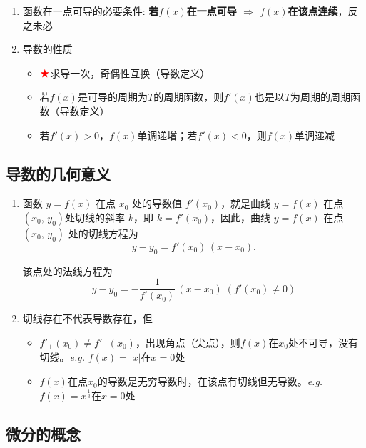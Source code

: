 \documentclass[a4paper,12pt]{article}
\begin{document}
\begin{enumerate}
        \item 函数在一点可导的必要条件: \textbf{若$f(x)$在一点可导 $\Rightarrow$ $f(x)$在该点连续}，反之未必
        \item 导数的性质
        \begin{itemize}
            \item $\color{red}{\bigstar}$求导一次，奇偶性互换（导数定义）
            \item 若$f(x)$是可导的周期为$T$的周期函数，则$f'(x)$也是以$T$为周期的周期函数（导数定义）
            \item 若$f'(x) > 0$，$f(x)$单调递增；若$f'(x) < 0$，则$f(x)$单调递减
        \end{itemize}
    \end{enumerate}

    \subsection{导数的几何意义}

    \begin{enumerate}
        \item 函数 $y=f(x)$ 在点 $x_0$ 处的导数值 $f'(x_0)$，就是曲线 $y=f(x)$ 在点 $(x_0,\,y_0)$处切线的斜率 $k$，即 $k = f'(x_0)$，因此，曲线 $y=f(x)$ 在点 $(x_0,\,y_0)$ 处的切线方程为
        \[
            y - y_0 = f'(x_0)\,(x - x_0).
        \]

        该点处的法线方程为
        \[
            y - y_0 = -\frac{1}{f'(x_0)}\,(x - x_0) \; (f'(x_0) \neq 0)
        \]
        \item 切线存在不代表导数存在，但{\color{red}{导数存在切线一定存在}}
        \begin{itemize}
            \item $f'_+(x_0) \neq f'_-(x_0)$，出现角点（尖点），则$f(x)$在$x_0$处不可导，没有切线。\emph{e.g.} $f(x) = |x|$在$x = 0$处
            \item $f(x)$在点$x_0$的导数是无穷导数时，在该点有切线但无导数。\emph{e.g.} $f(x) = x^\frac{1}{3}$在$x = 0$处
        \end{itemize}
    \end{enumerate}

    \subsection{微分的概念}
\end{document}
